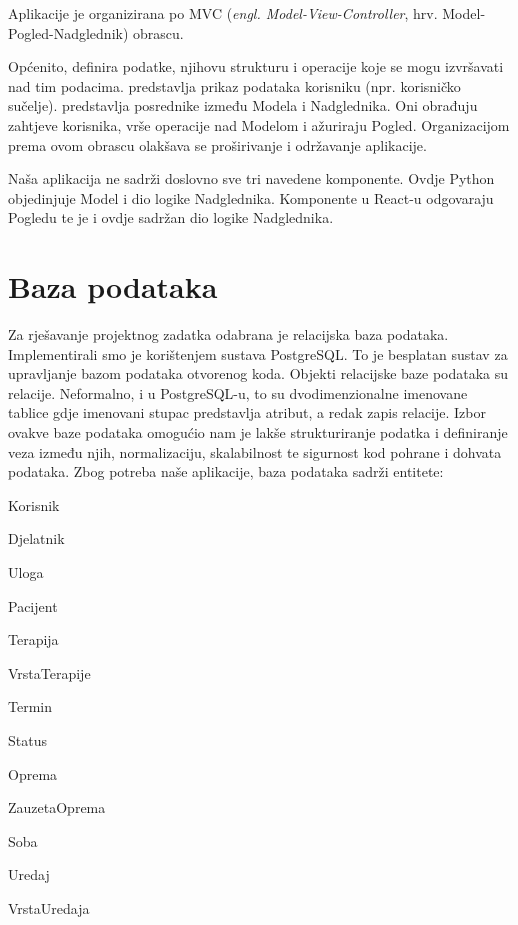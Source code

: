 Aplikacije je organizirana po MVC (\textit{engl. Model-View-Controller}, hrv. Model-Pogled-Nadglednik) obrascu.  

Općenito,  definira podatke, njihovu strukturu i operacije koje se mogu izvršavati nad tim podacima.  predstavlja prikaz podataka korisniku (npr. korisničko sučelje).  predstavlja posrednike između Modela i Nadglednika. Oni obrađuju zahtjeve korisnika, vrše operacije nad Modelom i ažuriraju Pogled. Organizacijom prema ovom obrascu olakšava se proširivanje i održavanje aplikacije.

Naša aplikacija ne sadrži doslovno sve tri navedene komponente. Ovdje Python objedinjuje Model i dio logike Nadglednika. Komponente u React-u odgovaraju Pogledu te je i ovdje sadržan dio logike Nadglednika.

				
		\section{Baza podataka}

Za rješavanje projektnog zadatka odabrana je relacijska baza podataka. Implementirali smo je korištenjem sustava PostgreSQL. To je besplatan sustav za upravljanje bazom podataka otvorenog koda. Objekti relacijske baze podataka su relacije. Neformalno, i u PostgreSQL-u, to su dvodimenzionalne imenovane tablice gdje imenovani stupac predstavlja atribut, a redak zapis relacije. Izbor ovakve baze podataka omogućio nam je lakše strukturiranje podatka i definiranje veza između njih, normalizaciju, skalabilnost te sigurnost kod pohrane i dohvata podataka. 
Zbog potreba naše aplikacije, baza podataka sadrži entitete:

        \begin{packed_item}
		\item 	\textnormal{Korisnik}
		\item 	\textnormal{Djelatnik}
		\item 	\textnormal{Uloga}
        \item 	\textnormal{Pacijent}
        \item 	\textnormal{Terapija}
        \item 	\textnormal{VrstaTerapije}	
        \item 	\textnormal{Termin}			
        \item 	\textnormal{Status}	
        \item 	\textnormal{Oprema}
        \item 	\textnormal{ZauzetaOprema}	
        \item 	\textnormal{Soba}	
        \item 	\textnormal{Uredaj}
        \item 	\textnormal{VrstaUredaja}
                   				
	 \end{packed_item}


